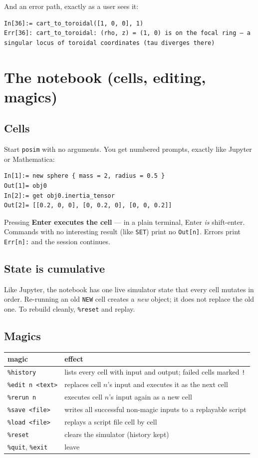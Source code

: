 \documentclass[11pt]{article}
\newcommand{\kw}[1]{\texttt{\uppercase{#1}}}
\newcommand{\code}[1]{\texttt{#1}}
\begin{document}
And an error path, exactly as a user sees it:

\begin{lstlisting}
In[36]:= cart_to_toroidal([1, 0, 0], 1)
Err[36]: cart_to_toroidal: (rho, z) = (1, 0) is on the focal ring — a singular locus of toroidal coordinates (tau diverges there)
\end{lstlisting}

\section{The notebook (cells, editing, magics)}

\subsection{Cells}
Start \code{posim} with no arguments. You get numbered prompts, exactly
like Jupyter or Mathematica:
\begin{lstlisting}
In[1]:= new sphere { mass = 2, radius = 0.5 }
Out[1]= obj0
In[2]:= get obj0.inertia_tensor
Out[2]= [[0.2, 0, 0], [0, 0.2, 0], [0, 0, 0.2]]
\end{lstlisting}
Pressing \textbf{Enter executes the cell} --- in a plain terminal, Enter
\emph{is} shift-enter. Commands with no interesting result (like
\kw{set}) print no \code{Out[n]}. Errors print \code{Err[n]:} and the
session continues.

\subsection{State is cumulative}
Like Jupyter, the notebook has one live simulator state that every cell
mutates in order. Re-running an old \kw{new} cell creates a \emph{new}
object; it does not replace the old one. To rebuild cleanly,
\code{\%reset} and replay.

\subsection{Magics}\label{sec:magics}
\begin{center}
\begin{tabular}{lp{9.8cm}}
\textbf{magic} & \textbf{effect}\\\hline
\code{\%history} & lists every cell with input and output; failed cells marked \code{!}\\
\code{\%edit n <text>} & replaces cell $n$'s input and executes it as the next cell\\
\code{\%rerun n} & executes cell $n$'s input again as a new cell\\
\code{\%save <file>} & writes all successful non-magic inputs to a replayable script\\
\code{\%load <file>} & replays a script file cell by cell\\
\code{\%reset} & clears the simulator (history kept)\\
\code{\%quit}, \code{\%exit} & leave\\
\end{tabular}
\end{center}
\end{document}
